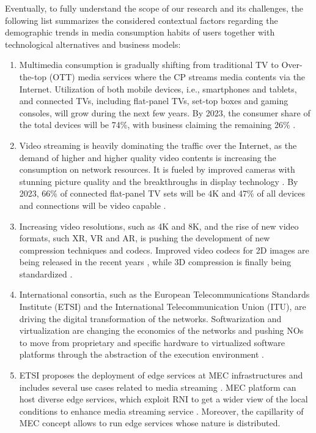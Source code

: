 Eventually, to fully understand the scope of our research and its challenges, the following list summarizes the considered contextual factors regarding the demographic trends in media consumption habits of users together with technological alternatives and business models:

\begin{enumerate}
	
	\item Multimedia consumption is gradually shifting from traditional TV to Over-the-top (OTT) media services where the CP streams media contents via the Internet. Utilization of both mobile devices, i.e., smartphones and tablets, and connected TVs, including flat-panel TVs, set-top boxes and gaming consoles, will grow during the next few years. By 2023, the consumer share of the total devices will be 74\%, with business claiming the remaining 26\% \cite{Cisco2020}.
	
	\item Video streaming is heavily dominating the traffic over the Internet, as the demand of higher and higher quality video contents is increasing the consumption on network resources. It is fueled by improved cameras with stunning picture quality \cite{saad2015} and the breakthroughs in display technology \cite{kathirgamanathan2015electroluminescent}. By 2023, 66\% of connected flat-panel TV sets will be 4K \cite{Cisco2020} and 47\% of all devices and connections will be video capable \cite{Cisco2020-2}.
	
	\item Increasing video resolutions, such as 4K and 8K, and the rise of new video formats, such XR, VR and AR, is pushing the development of new compression techniques and codecs. Improved video codecs for 2D images are being released in the recent years \cite{chen2018overview, sidaty2019compression}, while 3D compression is finally being standardized \cite{schwarz2018emerging}.
	
	\item International consortia, such as the European Telecommunications Standards Institute (ETSI) and the International Telecommunication Union (ITU), are driving the digital transformation of the networks. Softwarization and virtualization are changing the economics of the networks and pushing NOs to move from proprietary and specific hardware to virtualized software platforms through the abstraction of the execution environment \cite{Hernandez2015}.
	
	\item ETSI proposes the deployment of edge services at MEC infrastructures and includes several use cases related to media streaming \cite{etsigsmec002}. MEC platform can host diverse edge services, which exploit RNI to get a wider view of the local conditions to enhance media streaming service \cite{Tan2018, Martin2019}. Moreover, the capillarity of MEC concept allows to run edge services whose nature is distributed.
	

\end{enumerate}

